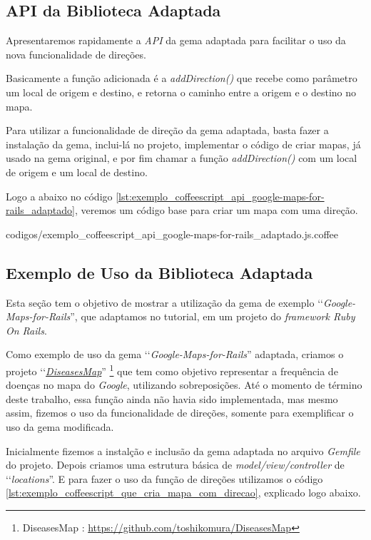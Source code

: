 \subsection{API da Biblioteca Adaptada}
\label{subsection:api_da_biblioteca_adaptada}


Apresentaremos rapidamente a \emph{API} da gema adaptada para facilitar o uso da nova funcionalidade
de direções.

Basicamente a função adicionada é a \emph{addDirection()} que recebe como parâmetro um local de origem
e destino, e retorna o caminho entre a origem e o destino no mapa.

Para utilizar a funcionalidade de direção da gema adaptada, basta fazer a instalação da gema, inclui-lá
no projeto, implementar o código de criar mapas, já usado na gema original, e por fim chamar a função
\emph{addDirection()} com um local de origem e um local de destino.

Logo a abaixo no código \ref{lst:exemplo_coffeescript_api_google-maps-for-rails_adaptado}, veremos um
código base para criar um mapa com uma direção.


{codigos/exemplo_coffeescript_api_google-maps-for-rails_adaptado.js.coffee}


\subsection{Exemplo de Uso da Biblioteca Adaptada}
\label{subsection:exemplo_de_uso_da_biblioteca_adaptada}

Esta seção tem o objetivo de mostrar a utilização da gema de exemplo ‘‘\emph{Google-Maps-for-Rails}'',
que adaptamos no tutorial, em um projeto do \emph{framework Ruby On Rails}.

Como exemplo de uso da gema ‘‘\emph{Google-Maps-for-Rails}'' adaptada, criamos o projeto 
‘‘\emph{\href{https://github.com/toshikomura/DiseasesMap}{DiseasesMap}}'' 
\footnote{DiseasesMap : \url{https://github.com/toshikomura/DiseasesMap}} que tem como objetivo representar 
a frequência de doenças no mapa do \emph{Google}, utilizando sobreposições. Até o momento de término deste
trabalho, essa função ainda não havia sido implementada, mas mesmo assim, fizemos o uso da
funcionalidade de direções, somente para exemplificar o uso da gema modificada.

Inicialmente fizemos a instalção e inclusão da gema adaptada no arquivo \emph{Gemfile} do projeto. Depois 
criamos uma estrutura básica de \emph{model/view/controller} de ‘‘\emph{locations}''. E para fazer o uso
da função de direções utilizamos o código \ref{lst:exemplo_coffeescript_que_cria_mapa_com_direcao},
explicado logo abaixo.

